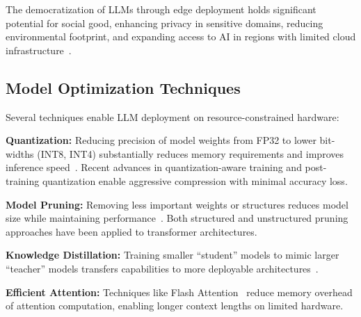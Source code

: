 The democratization of LLMs through edge deployment holds significant potential for social good, enhancing privacy in sensitive domains, reducing environmental footprint, and expanding access to AI in regions with limited cloud infrastructure~\cite{zheng2024edgellm}.

\subsection{Model Optimization Techniques}

Several techniques enable LLM deployment on resource-constrained hardware:

\textbf{Quantization:} Reducing precision of model weights from FP32 to lower bit-widths (INT8, INT4) substantially reduces memory requirements and improves inference speed~\cite{dettmers2022llmint8,frantar2023gptq}. Recent advances in quantization-aware training and post-training quantization enable aggressive compression with minimal accuracy loss.%

\textbf{Model Pruning:} Removing less important weights or structures reduces model size while maintaining performance~\cite{frantar2023sparsegpt,kim2024shortened}. Both structured and unstructured pruning approaches have been applied to transformer architectures.

\textbf{Knowledge Distillation:} Training smaller ``student'' models to mimic larger ``teacher'' models transfers capabilities to more deployable architectures~\cite{hinton2015distilling,gu2023minillm,yang2022distilling,guo2025deepseek}. %

\textbf{Efficient Attention:} Techniques like Flash Attention~\cite{dao2022flashattention} reduce memory overhead of attention computation, enabling longer context lengths on limited hardware.

